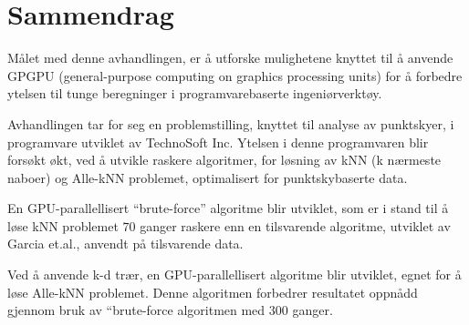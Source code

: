
\section*{Sammendrag}


M{\aa}let med denne avhandlingen, er {\aa} utforske mulighetene knyttet til {\aa} anvende GPGPU (general-purpose computing on graphics processing units) for {\aa} forbedre ytelsen til tunge beregninger i programvarebaserte ingeni{\o}rverkt{\o}y.

Avhandlingen tar for seg en problemstilling, knyttet til analyse av punktskyer, i programvare utviklet av TechnoSoft Inc. Ytelsen i denne programvaren blir fors{\o}kt {\o}kt, ved {\aa} utvikle raskere algoritmer, for l{\o}sning av kNN (k n{\ae}rmeste naboer) og Alle-kNN problemet, optimalisert for punktskybaserte data.

En GPU-parallellisert “brute-force” algoritme blir utviklet, som er i stand til {\aa} l{\o}se kNN problemet $70$ ganger raskere enn en tilsvarende algoritme, utviklet av Garcia et.al.\cite{Garcia2008}, anvendt p{\aa} tilsvarende data.

Ved {\aa} anvende k-d tr{\ae}r, en GPU-parallellisert algoritme blir utviklet, egnet for {\aa} l{\o}se Alle-kNN problemet. Denne algoritmen forbedrer resultatet oppn{\aa}dd gjennom bruk av “brute-force algoritmen med 300 ganger.


\clearpage\
